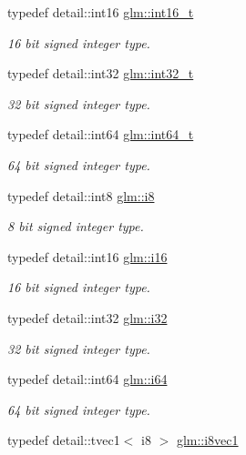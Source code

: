 \begin{DoxyCompactItemize}
typedef detail\-::int16 \hyperlink{group__gtc__type__precision_gaf89ee61e0d34aa4a462104b7ae7f2da6}{glm\-::int16\-\_\-t}
\begin{DoxyCompactList}\small\item\em 16 bit signed integer type. \end{DoxyCompactList}\item 
typedef detail\-::int32 \hyperlink{group__gtc__type__precision_gab870c0eb6f525b0c8c4716762e0fc3a8}{glm\-::int32\-\_\-t}
\begin{DoxyCompactList}\small\item\em 32 bit signed integer type. \end{DoxyCompactList}\item 
typedef detail\-::int64 \hyperlink{group__gtc__type__precision_ga6abb23fbf4e39c50ec5341160b5da5ab}{glm\-::int64\-\_\-t}
\begin{DoxyCompactList}\small\item\em 64 bit signed integer type. \end{DoxyCompactList}\item 
typedef detail\-::int8 \hyperlink{group__gtc__type__precision_gaae064be68b7d36cd7910c16e8ad18bba}{glm\-::i8}
\begin{DoxyCompactList}\small\item\em 8 bit signed integer type. \end{DoxyCompactList}\item 
typedef detail\-::int16 \hyperlink{group__gtc__type__precision_ga35e5542ca05b29cc256fdafb8503d1fd}{glm\-::i16}
\begin{DoxyCompactList}\small\item\em 16 bit signed integer type. \end{DoxyCompactList}\item 
typedef detail\-::int32 \hyperlink{group__gtc__type__precision_ga1d8ed5c43e91ea7d4528389da4fa9524}{glm\-::i32}
\begin{DoxyCompactList}\small\item\em 32 bit signed integer type. \end{DoxyCompactList}\item 
typedef detail\-::int64 \hyperlink{group__gtc__type__precision_gac7a7eaad46064fc952b06df33689da23}{glm\-::i64}
\begin{DoxyCompactList}\small\item\em 64 bit signed integer type. \end{DoxyCompactList}\item 
typedef detail\-::tvec1$<$ i8 $>$ \hyperlink{group__gtc__type__precision_ga7d8b7cc439e81d9deef1477dcbe4bd0b}{glm\-::i8vec1}

\end{DoxyCompactItemize}
